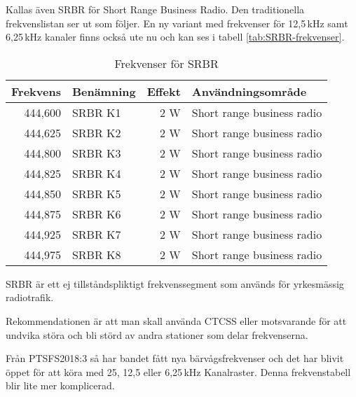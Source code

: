Kallas även SRBR för Short Range Business Radio.  Den traditionella
frekvenslistan ser ut som följer. En ny variant med frekvenser för
12,5\,kHz samt 6,25\,kHz kanaler finns också ute nu och kan ses i
tabell \ref{tab:SRBR-frekvenser}.

\begin{table}[h]
	\centering
\begin{tabular}{rlrl}
\textbf{Frekvens} & \textbf{Benämning} & \textbf{Effekt} & \textbf{Användningsområde} \\ \hline
444,600 & SRBR K1            & 2 W             & Short range business radio \\
444,625 & SRBR K2            & 2 W             & Short range business radio \\
444,800 & SRBR K3            & 2 W             & Short range business radio \\
444,825 & SRBR K4            & 2 W             & Short range business radio \\
444,850 & SRBR K5            & 2 W             & Short range business radio \\
444,875 & SRBR K6            & 2 W             & Short range business radio \\
444,925 & SRBR K7            & 2 W             & Short range business radio \\
444,975 & SRBR K8            & 2 W             & Short range business radio
\end{tabular}
\caption{Frekvenser för SRBR}
\end{table}

SRBR är ett ej tillståndspliktigt frekvenssegment som används för
yrkesmässig radiotrafik.

Rekommendationen är att man skall använda CTCSS eller motsvarande för
att undvika störa och bli störd av andra stationer som delar
frekvenserna.

Från PTSFS2018:3 så har bandet fått nya bärvågsfrekvenser och det har
blivit öppet för att köra med 25, 12,5 eller 6,25\,kHz
Kanalraster. Denna frekvenstabell blir lite mer komplicerad.

